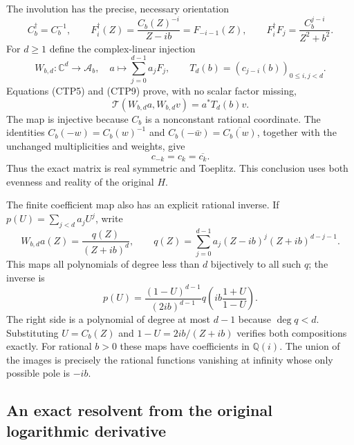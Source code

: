 The involution has the precise, necessary orientation
\begin{equation}\tag{CTP9}
 C_b^\dagger=C_b^{-1},\qquad
 F_i^\dagger(Z)=\frac{C_b(Z)^{-i}}{Z-ib}=F_{-i-1}(Z),\qquad
 F_i^\dagger F_j=\frac{C_b^{j-i}}{Z^2+b^2}.
\end{equation}
For $d\ge1$ define the complex-linear injection
\begin{equation}\tag{CTP10}
 W_{b,d}:\mathbb C^d\longrightarrow\mathscr A_b,\quad
 a\longmapsto\sum_{j=0}^{d-1}a_jF_j,\qquad
 T_d(b)=(c_{j-i}(b))_{0\le i,j<d}.
\end{equation}
Equations (CTP5) and (CTP9) prove, with no scalar factor missing,
\begin{equation}\tag{CTP11}
 \mathcal T(W_{b,d}a,W_{b,d}v)=a^*T_d(b)v.
\end{equation}
The map is injective because $C_b$ is a nonconstant rational
coordinate. The identities $C_b(-w)=C_b(w)^{-1}$ and
$C_b(-\bar w)=\overline{C_b(w)}$, together with the unchanged
multiplicities and weights, give
\begin{equation}\tag{CTP12}
 c_{-k}=c_k=\overline{c_k}.
\end{equation}
Thus the exact matrix is real symmetric and Toeplitz. This conclusion
uses both evenness and reality of the original $H$.

The finite coefficient map also has an explicit rational inverse.
If $p(U)=\sum_{j<d}a_jU^j$, write
\begin{equation}\tag{CTP13}
 W_{b,d}a(Z)=\frac{q(Z)}{(Z+ib)^d},\qquad
 q(Z)=\sum_{j=0}^{d-1}a_j(Z-ib)^j(Z+ib)^{d-j-1}.
\end{equation}
This maps all polynomials of degree less than $d$ bijectively to
all such $q$; the inverse is
\begin{equation}\tag{CTP14}
 p(U)=\frac{(1-U)^{d-1}}{(2ib)^{d-1}}
                  q\!\left(ib\frac{1+U}{1-U}\right).
\end{equation}
The right side is a polynomial of degree at most $d-1$ because
$\deg q<d$. Substituting $U=C_b(Z)$ and
$1-U=2ib/(Z+ib)$ verifies both compositions exactly. For rational
$b>0$ these maps have coefficients in $\mathbb Q(i)$.
The union of the images is precisely the rational functions
vanishing at infinity whose only possible pole is $-ib$.

\subsection{An exact resolvent from the original logarithmic derivative}

